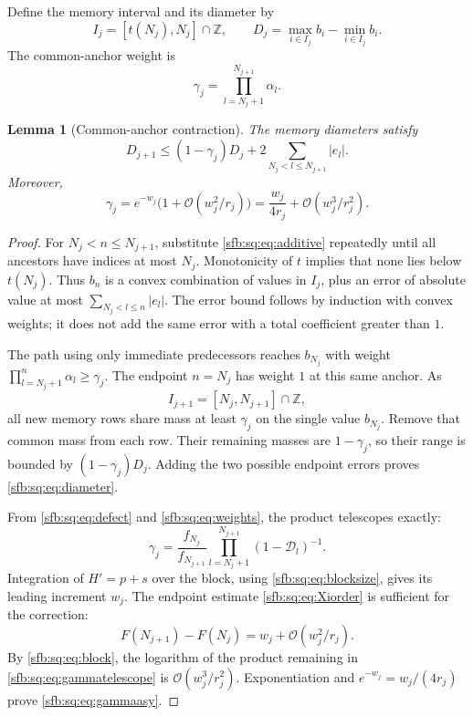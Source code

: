 \documentclass[11pt]{article}
\newtheorem{lemma}[theorem]{Lemma}
\theoremstyle{remark}\newtheorem{remark}[theorem]{Remark}
\newcommand{\OO}{\mathcal O}
\newcommand{\Z}{\mathbb Z}
\begin{document}
Define the memory interval and its diameter by
\begin{equation}\label{sfb:sq:eq:memory}
 I_j=[t(N_j),N_j]\cap\Z,\qquad
 D_j=\max_{i\in I_j}b_i-\min_{i\in I_j}b_i.
\end{equation}
The common-anchor weight is
\begin{equation}\label{sfb:sq:eq:gamma}
 \gamma_j=\prod_{l=N_j+1}^{N_{j+1}}\alpha_l.
\end{equation}

\begin{lemma}[Common-anchor contraction]\label{sfb:sq:lem:anchor}
The memory diameters satisfy
\begin{equation}\label{sfb:sq:eq:diameter}
 D_{j+1}\le(1-\gamma_j)D_j
       +2\sum_{N_j<l\le N_{j+1}}|e_l|.
\end{equation}
Moreover,
\begin{equation}\label{sfb:sq:eq:gammaasy}
 \gamma_j=e^{-w_j}\bigl(1+\OO(w_j^2/r_j)\bigr)
 =\frac{w_j}{4r_j}+\OO(w_j^3/r_j^2).
\end{equation}
\end{lemma}
\begin{proof}
For $N_j<n\le N_{j+1}$, substitute \eqref{sfb:sq:eq:additive} repeatedly until all ancestors have indices at most $N_j$. Monotonicity of $t$ implies that none lies below $t(N_j)$. Thus $b_n$ is a convex combination of values in $I_j$, plus an error of absolute value at most $\sum_{N_j<l\le n}|e_l|$. The error bound follows by induction with convex weights; it does not add the same error with a total coefficient greater than $1$.

The path using only immediate predecessors reaches $b_{N_j}$ with weight $\prod_{l=N_j+1}^{n}\alpha_l\ge\gamma_j$. The endpoint $n=N_j$ has weight $1$ at this same anchor. As
\[
 I_{j+1}=[N_j,N_{j+1}]\cap\Z,
\]
all new memory rows share mass at least $\gamma_j$ on the single value $b_{N_j}$. Remove that common mass from each row. Their remaining masses are $1-\gamma_j$, so their range is bounded by $(1-\gamma_j)D_j$. Adding the two possible endpoint errors proves \eqref{sfb:sq:eq:diameter}.

From \eqref{sfb:sq:eq:defect} and \eqref{sfb:sq:eq:weights}, the product telescopes exactly:
\begin{equation}\label{sfb:sq:eq:gammatelescope}
 \gamma_j=\frac{f_{N_j}}{f_{N_{j+1}}}
       \prod_{l=N_j+1}^{N_{j+1}}(1-\mathcal D_l)^{-1}.
\end{equation}
Integration of $H'=p+s$ over the block, using \eqref{sfb:sq:eq:blocksize}, gives its leading increment $w_j$. The endpoint estimate \eqref{sfb:sq:eq:Xiorder} is sufficient for the correction:
\[
 F(N_{j+1})-F(N_j)=w_j+\OO(w_j^2/r_j).
\]
By \eqref{sfb:sq:eq:block}, the logarithm of the product remaining in \eqref{sfb:sq:eq:gammatelescope} is $\OO(w_j^3/r_j^2)$. Exponentiation and $e^{-w_j}=w_j/(4r_j)$ prove \eqref{sfb:sq:eq:gammaasy}.
\end{proof}
\end{document}

